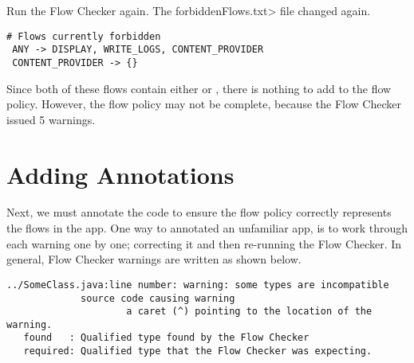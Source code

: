  
 Run the Flow Checker again. The \<forbiddenFlows.txt> file changed again.
\begin{Verbatim}
# Flows currently forbidden
 ANY -> DISPLAY, WRITE_LOGS, CONTENT_PROVIDER 
 CONTENT_PROVIDER -> {}
 \end{Verbatim}
 Since both of these flows contain either  or \perm{\{\}}, there is nothing to add 
 to the flow policy.  However, the flow policy may not be complete, because the Flow Checker
 issued 5 warnings.  



\section{Adding Annotations}

Next, we must annotate the code to ensure the flow policy correctly represents the flows
in the app.  One way to annotated an unfamiliar app, is to work through each warning
one by one; correcting it and then re-running the Flow Checker.  In general, 
Flow Checker warnings are written as shown below.

\begin{Verbatim}  
../SomeClass.java:line number: warning: some types are incompatible 
             source code causing warning
                     a caret (^) pointing to the location of the warning.
   found   : Qualified type found by the Flow Checker
   required: Qualified type that the Flow Checker was expecting.
\end{Verbatim}
 

